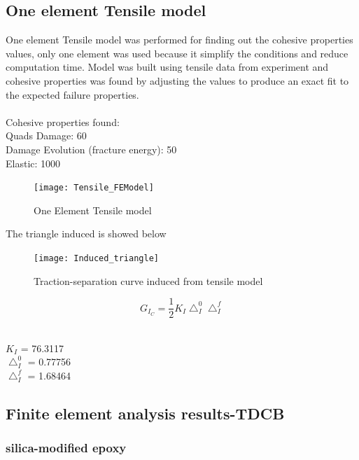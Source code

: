 \documentclass[numbers=noendperiod,chapterprefix=on]{icldt} %
\begin{document}
\subsection{One element Tensile model}
 One element Tensile model was performed for finding out the cohesive properties values, only one element was used because it simplify the conditions and reduce computation time. Model was built using tensile data from experiment and cohesive properties was found by adjusting the values to produce an exact fit to the expected failure properties. \\
 \\
 Cohesive properties found:\\
 Quads Damage: 60\\
  Damage Evolution (fracture energy): 50\\
  Elastic: 1000 
  \\
 \begin{figure}[!htpb]
  \centering
  \texttt{[image: Tensile\_FEModel]}
  \caption{One Element Tensile model}\label{Tensile_FEModel}
  \end{figure}
  \FloatBarrier

 The triangle induced is showed below
 \begin{figure}[!htpb]
 \centering
 \texttt{[image: Induced\_triangle]}
 \caption{Traction-separation curve induced from tensile model}\label{Induced_triangle}
 \end{figure}
 \FloatBarrier
 
 \begin{equation} 
 G_{I_C}  =\frac{1}{2}K_{I} \bigtriangleup^{0}_I \bigtriangleup^{f}_I
 \end{equation}
 \\
\begin{center}
 $K_{I}$ = 76.3117 \\
 $\bigtriangleup^{0}_I $ = 0.77756 \\
 $ \bigtriangleup^{f}_I $ = 1.68464\\
\end{center}
 

\subsection{Finite element analysis results-TDCB}


\subsubsection{silica-modified epoxy}
\end{document}
